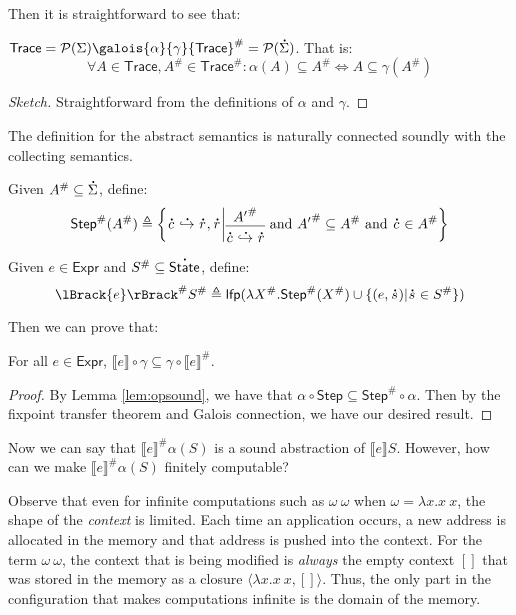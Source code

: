 \documentclass[acmsmall,screen,review]{acmart}\settopmatter{printfolios=true,printccs=false,printacmref=false}
\theoremstyle{acmdefinition}
\newcommand*{\pset}{\mathcal{P}}
\newcommand*{\A}[1]{\overset{\,_{\mbox{\Large .}}}{#1}}
\newcommand*{\Abs}[1]{{#1}^{\#}}
\newcommand*{\Expr}{\mathsf{Expr}}
\newcommand*{\Trace}{\mathsf{Trace}}
\newcommand*{\config}{c}
\newcommand*{\rightst}{r}
\newcommand*{\State}{\mathsf{State}}
\newcommand*{\lfp}{\mathsf{lfp}}
\newcommand*{\Step}{\mathsf{Step}}
\newcommand*{\semarrow}{\hookrightarrow}
\newcommand*{\sembracket}[1]{\lBrack{#1}\rBrack}
\begin{document}
Then it is straightforward to see that:
\begin{lemma}
  $\Trace=\pset(\Sigma)\galois{\alpha}{\gamma}\Abs{\Trace}=\pset(\A\Sigma)$. That is:
  \[\forall A\in \Trace,\Abs{A}\in\Abs{\Trace}:\alpha(A)\subseteq\Abs{A}\Leftrightarrow A\subseteq\gamma(\Abs{A})\]
\end{lemma}
\begin{proof}[Sketch]
  Straightforward from the definitions of $\alpha$ and $\gamma$.
\end{proof}

The definition for the abstract semantics is naturally connected soundly with the collecting semantics.
\begin{definition}
  Given $\Abs{A}\subseteq\A{\Sigma}$, define:
  \[
    \Abs{\mathsf{Step}}(\Abs{A})\triangleq
    \left\{\A\config\A\semarrow\A\rightst, \A\rightst\middle|
    \begin{prooftree}[center=true]
      \hypo{\Abs{A'}}\infer1{\A\config\A\semarrow\A\rightst}
    \end{prooftree}\text{ and }
    \Abs{A'}\subseteq \Abs{A}\text{ and }\A\config\in\Abs{A}
    \right\}
  \]
\end{definition}
\begin{definition}
  Given $e\in\Expr$ and $\Abs{S}\subseteq\A\State$, define:
  \[
    \Abs{\sembracket{e}}\Abs{S}\triangleq\lfp(\lambda \Abs{X}.\Abs{\mathsf{Step}}(\Abs{X})\cup\{(e,\A{s})|\A{s}\in \Abs{S}\})
  \]
\end{definition}
Then we can prove that:
\begin{theorem}[Soundness]
  For all $e\in\Expr$, $\sembracket{e}\circ\gamma\subseteq\gamma\circ\Abs{\sembracket{e}}$.
\end{theorem}
\begin{proof}
  By Lemma \ref{lem:opsound}, we have that $\alpha\circ\Step\subseteq\Abs\Step\circ\alpha$.
  Then by the fixpoint transfer theorem and Galois connection, we have our desired result.
\end{proof}

Now we can say that $\Abs{\sembracket{e}}\alpha(S)$ is a sound abstraction of $\sembracket{e}S$.
However, how can we make $\Abs{\sembracket{e}}\alpha(S)$ finitely computable?

Observe that even for infinite computations such as $\omega\:\omega$ when $\omega=\lambda x.x\:x$,
the shape of the \emph{context} is limited.
Each time an application occurs, a new address is allocated in the memory and that address is pushed into the context.
For the term $\omega\:\omega$, the context that is being modified is \emph{always} the empty context $[]$ that was stored in the memory as a closure $\langle\lambda x.x\:x,[]\rangle$.
Thus, the only part in the configuration that makes computations infinite is the domain of the memory.
\end{document}
